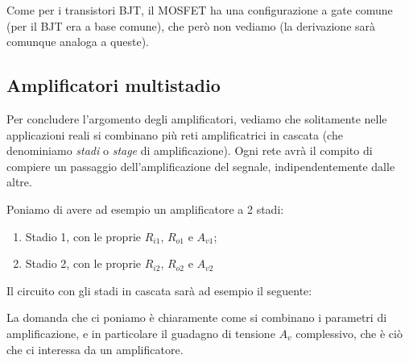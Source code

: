 \documentclass[a4paper,11pt]{article}
\begin{document}
\par\smallskip

Come per i transistori BJT, il MOSFET ha una configurazione a gate comune (per il BJT era a base comune), che però non vediamo (la derivazione sarà comunque analoga a queste).

\subsection{Amplificatori multistadio}
Per concludere l'argomento degli amplificatori, vediamo che solitamente nelle applicazioni reali si combinano più reti amplificatrici in cascata (che denominiamo \textit{stadi} o \textit{stage} di amplificazione). Ogni rete avrà il compito di compiere un passaggio dell'amplificazione del segnale, indipendentemente dalle altre.

Poniamo di avere ad esempio un amplificatore a 2 stadi:
\begin{enumerate}
	\item Stadio 1, con le proprie $R_{i1}$, $R_{o1}$ e $A_{v1}$;
	\item Stadio 2, con le proprie $R_{i2}$, $R_{o2}$ e $A_{v2}$
\end{enumerate}
Il circuito con gli stadi in cascata sarà ad esempio il seguente:

\begin{center}
\end{center}

La domanda che ci poniamo è chiaramente come si combinano i parametri di amplificazione, e in particolare il guadagno di tensione $A_v$ complessivo, che è ciò che ci interessa da un amplificatore.
\end{document}
